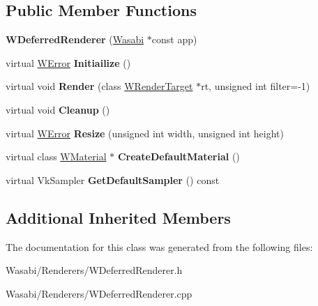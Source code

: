 \subsection*{Public Member Functions}
\begin{DoxyCompactItemize}
\item 
{\bfseries W\+Deferred\+Renderer} (\hyperlink{class_wasabi}{Wasabi} $\ast$const app)\hypertarget{class_w_deferred_renderer_a0a9bf60786f58b8b3c53b3b8036ad8b6}{}\label{class_w_deferred_renderer_a0a9bf60786f58b8b3c53b3b8036ad8b6}

\item 
virtual \hyperlink{class_w_error}{W\+Error} {\bfseries Initiailize} ()\hypertarget{class_w_deferred_renderer_a7bfa930ee2673c56b3a00cf51cec323e}{}\label{class_w_deferred_renderer_a7bfa930ee2673c56b3a00cf51cec323e}

\item 
virtual void {\bfseries Render} (class \hyperlink{class_w_render_target}{W\+Render\+Target} $\ast$rt, unsigned int filter=-\/1)\hypertarget{class_w_deferred_renderer_a4ba34dc93416b97dd775d5cfbf505a2e}{}\label{class_w_deferred_renderer_a4ba34dc93416b97dd775d5cfbf505a2e}

\item 
virtual void {\bfseries Cleanup} ()\hypertarget{class_w_deferred_renderer_a8a99a00ef6708456bb3a54fa453dead4}{}\label{class_w_deferred_renderer_a8a99a00ef6708456bb3a54fa453dead4}

\item 
virtual \hyperlink{class_w_error}{W\+Error} {\bfseries Resize} (unsigned int width, unsigned int height)\hypertarget{class_w_deferred_renderer_ad7abd964254d9bb455352d70c038d67c}{}\label{class_w_deferred_renderer_ad7abd964254d9bb455352d70c038d67c}

\item 
virtual class \hyperlink{class_w_material}{W\+Material} $\ast$ {\bfseries Create\+Default\+Material} ()\hypertarget{class_w_deferred_renderer_aa4186f060d7753bf4ddeae3beadc30ed}{}\label{class_w_deferred_renderer_aa4186f060d7753bf4ddeae3beadc30ed}

\item 
virtual Vk\+Sampler {\bfseries Get\+Default\+Sampler} () const \hypertarget{class_w_deferred_renderer_abe363468c917d778e02a150d290c5072}{}\label{class_w_deferred_renderer_abe363468c917d778e02a150d290c5072}

\end{DoxyCompactItemize}
\subsection*{Additional Inherited Members}


The documentation for this class was generated from the following files\+:\begin{DoxyCompactItemize}
\item 
Wasabi/\+Renderers/W\+Deferred\+Renderer.\+h\item 
Wasabi/\+Renderers/W\+Deferred\+Renderer.\+cpp\end{DoxyCompactItemize}
